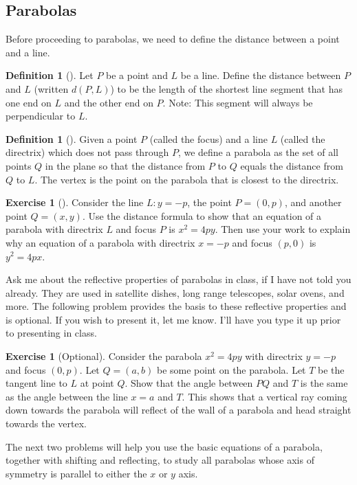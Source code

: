 \documentclass[10pt,]{book}
\theoremstyle{plain}
\theoremstyle{definition}
\newtheorem{definition}[theorem]{Definition}
\theoremstyle{definition}
\theoremstyle{definition}
\theoremstyle{definition}
\newtheorem{exploration}[project]{Exercise}
\theoremstyle{definition}
\numberwithin{equation}{section}
\begin{document}
\subsection[{Parabolas}]{Parabolas}\label{subsection-15}
Before proceeding to parabolas, we need to define the distance between a point and a line.%
\begin{definition}[{}]\label{definition-14}
Let \(P\) be a point and \(L\) be a line. Define the distance between \(P\) and \(L\) (written \(d(P,L)\)) to be the length of the shortest line segment that has one end on \(L\) and the other end on \(P\). Note: This segment will always be perpendicular to \(L\).%
\end{definition}
\begin{definition}[{}]\label{definition-15}
Given a point \(P\) (called the focus) and a line \(L\) (called the directrix) which does not pass through \(P\), we define a parabola as the set of all points \(Q\) in the plane so that the distance from \(P\) to \(Q\) equals the distance from \(Q\) to \(L\). The vertex is the point on the parabola that is closest to the directrix.%
\end{definition}
\begin{exploration}[]\label{exploration-55}
Consider the line \(L:y=-p\), the point \(P=(0,p)\), and another point \(Q=(x,y)\). Use the distance formula to show that an equation of a parabola with directrix \(L\) and focus \(P\) is \(x^2=4py\). Then use your work to explain why an equation of a parabola with directrix \(x=-p\) and focus \((p,0)\) is \(y^2=4px\).%
\end{exploration}
Ask me about the reflective properties of parabolas in class, if I have not told you already. They are used in satellite dishes, long range telescopes, solar ovens, and more. The following problem provides the basis to these reflective properties and is optional. If you wish to present it, let me know. I'll have you type it up prior to presenting in class.%
\begin{exploration}[Optional]\label{exploration-56}
Consider the parabola \(x^2=4py\) with directrix \(y=-p\) and focus \((0,p)\). Let \(Q=(a,b)\) be some point on the parabola. Let \(T\) be the tangent line to \(L\) at point \(Q\). Show that the angle between \(PQ\) and \(T\) is the same as the angle between the line \(x=a\) and \(T\). This shows that a vertical ray coming down towards the parabola will reflect of the wall of a parabola and head straight towards the vertex.%
\end{exploration}
The next two problems will help you use the basic equations of a parabola, together with shifting and reflecting, to study all parabolas whose axis of symmetry is parallel to either the \(x\) or \(y\) axis.%
\end{document}
